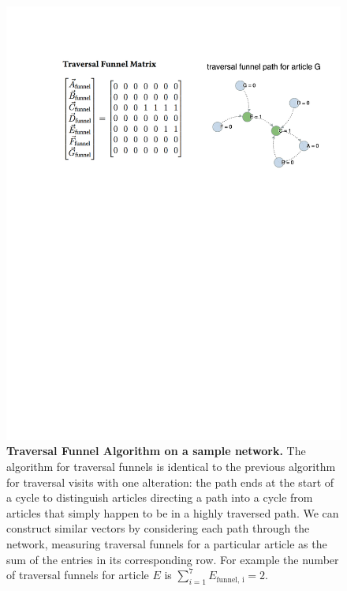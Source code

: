 \documentclass[pre,twocolumn,twoside,superscriptaddress,floatfix, aps, 10pt]{revtex4-1}
\begin{document}
\begin{figure}[tp!]
  \centering	
  \includegraphics[width=\columnwidth]{graphics/traversal_funnel_algo_figure.pdf}
  \caption{
    \textbf{Traversal Funnel Algorithm on a sample network.}
  The algorithm for traversal funnels is identical to the previous algorithm for traversal visits with one alteration: the path ends at the start of a cycle to distinguish articles directing a path into a cycle from articles that simply happen to be in a highly traversed path. We can construct similar vectors by considering each path through the network, measuring traversal funnels for a particular article as the sum of the entries in its corresponding row. For example
  the number of traversal funnels for article $E$ is 
  $\sum_{i=1}^7 E_{\text{funnel, i}} = 2$.}
  \label{fig:Traversal Funnels}

\end{figure}
\end{document}
